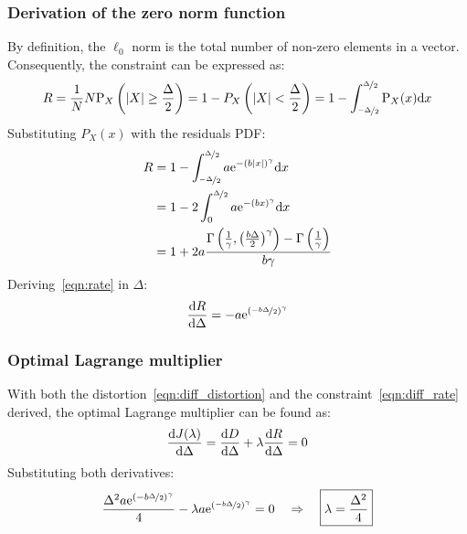 \documentclass[11pt,a4paper,openright,twoside]{book}
\numberwithin{equation}{section} %
\numberwithin{figure}{section} %
\numberwithin{table}{section} %
\begin{document}
\subsubsection{Derivation of the zero norm function}
\label{ssub:derivation_of_the_zero_norm_function}

By definition, the $\ell_0$ norm is the total number of non-zero
elements in a vector.
Consequently, the constraint can be expressed as:
\begin{equation}
	R 
	= \frac{1}{N} N \text{P}_X\left(\vert X \vert \ge \frac{\Delta}{2}\right)
	= 1-P_X\left(\vert X \vert < \frac{\Delta}{2}\right)
	= 1-\int_{\nicefrac{-\Delta}{2}}^{\nicefrac{\Delta}{2}}\text{P}_X(x)\text{d} x
	\label{eqn:int_rate}
\end{equation}
Substituting $P_X(x)$ with the residuals \ac{PDF}:
\begin{align}
	R
	&=1-\int_{\nicefrac{-\Delta}{2}}^{\nicefrac{\Delta}{2}}
	a \text{e}^{-{\left(b\vert x \vert\right)}^\gamma} \text{d} x \\
	&=1-2\int_0^{\nicefrac{\Delta}{2}}
	a \text{e}^{-{\left(b x \right)}^\gamma} \text{d} x \\
	&=1+2a\frac{\Gamma\left(
		\frac{1}{\gamma},{\left(\frac{b\Delta}{2}\right)}^\gamma\right)-
		\Gamma\left(\frac{1}{\gamma}\right)}
		{b\gamma}
	\label{eqn:rate}
\end{align}
Deriving~\eqref{eqn:rate} in $\Delta$:
\begin{equation}
	\frac{\text{d} R}{\text{d}\Delta} =
	-a\text{e}^{{\left(\nicefrac{-b\Delta}{2}\right)}^\gamma}
	\label{eqn:diff_rate}
\end{equation}
\subsubsection{Optimal Lagrange multiplier}
\label{ssub:optimal_lagrange_multiplier}

With both the distortion~\eqref{eqn:diff_distortion} and the
constraint~\eqref{eqn:diff_rate} derived, the optimal Lagrange
multiplier can be found as:
\begin{equation}
	\frac{\text{d} J(\lambda)}{\text{d} \Delta}
	= \frac{\text{d} D}{\text{d} \Delta} +
	\lambda \frac{\text{d} R}{\text{d} \Delta} = 0 \\
	\label{eqn:diff_lagrange_multiplier}
\end{equation}
Substituting both derivatives:
\begin{equation}
	\frac{\Delta^2 a \text{e}^{{(-b\nicefrac{\Delta}{2})}^\gamma}}{4}
	- \lambda
	a\text{e}^{{\left(\nicefrac{-b\Delta}{2}\right)}^\gamma} = 0
	\quad \Rightarrow \quad \boxed{\lambda = \frac{\Delta^2}{4}}
\end{equation}
\end{document}
